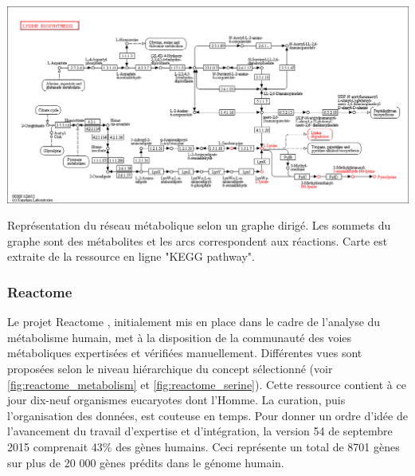 \begin{refsegment}
    \begin{shadedfigure}[H]
        \centering
        \includegraphics[width=\textwidth]{img/kegg_lysine.png}
        \caption{ Représentation du réseau métabolique selon un graphe dirigé. Les sommets du graphe sont des métabolites et les arcs correspondent aux réactions. Carte est extraite de la ressource en ligne "KEGG pathway". }
        \label{fig:kegg_lysine}
    \end{shadedfigure}
    
    \subsubsection{Reactome}
    Le projet Reactome \cite{joshi2005reactome,matthews2009reactome,croft2010reactome,croft2014reactome,fabregat2016reactome}, initialement mis en place dans le cadre de l’analyse du métabolisme humain, met à la disposition de la communauté des voies métaboliques expertisées et vérifiées manuellement. Différentes vues sont proposées selon le niveau hiérarchique du concept sélectionné (voir \cref{fig:reactome_metabolism} et \cref{fig:reactome_serine}). Cette ressource contient à ce jour dix-neuf organismes eucaryotes dont l’Homme. La curation, puis l'organisation des données, est couteuse en temps. Pour donner un ordre d'idée de l'avancement du travail d'expertise et d'intégration, la version 54 de septembre 2015 comprenait 43\% des gènes humains. Ceci représente un total de 8701 gènes sur plus de 20 000 gènes prédits dans le génome humain.
    

\end{refsegment}

